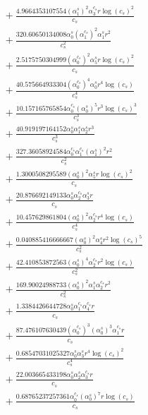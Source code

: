 \documentclass[10pt]{article}
\begin{document}
\begin{align*}
&{}  + \frac{4.9664353107554 \left(\alpha_{1}^s\right)^{2} \alpha_{3}^{c_s} r \log{\left(c_{s} \right)}^{2}}{c_{s}} \\
&{}  + \frac{320.60650134008 \alpha_{0}^s \left(\alpha_{1}^{c_s}\right)^{2} \alpha_{1}^s r^{2}}{c_{s}^{2}} \\
&{}  + \frac{2.5175750304999 \left(\alpha_{0}^{c_s}\right)^{2} \alpha_{5}^s r \log{\left(c_{s} \right)}^{2}}{c_{s}} \\
&{}  + \frac{40.575664933304 \left(\alpha_{0}^{c_s}\right)^{4} \alpha_{0}^s r^{4} \log{\left(c_{s} \right)}}{c_{s}^{4}} \\
&{}  + \frac{10.157165765854 \alpha_{0}^{c_s} \left(\alpha_{0}^s\right)^{5} r^{3} \log{\left(c_{s} \right)}^{3}}{c_{s}^{3}} \\
&{}  + \frac{40.919197164152 \alpha_{0}^s \alpha_{1}^s \alpha_{2}^s r^{3}}{c_{s}^{3}} \\
&{}  + \frac{327.36058924584 \alpha_{0}^{c_s} \alpha_{1}^{c_s} \left(\alpha_{1}^s\right)^{2} r^{2}}{c_{s}^{2}} \\
&{}  + \frac{1.3000508295589 \left(\alpha_{0}^s\right)^{2} \alpha_{5}^s r \log{\left(c_{s} \right)}^{2}}{c_{s}} \\
&{}  + \frac{20.876692149133 \alpha_{0}^s \alpha_{2}^{c_s} \alpha_{3}^s r}{c_{s}} \\
&{}  + \frac{10.457629861804 \left(\alpha_{0}^s\right)^{2} \alpha_{2}^{c_s} r^{4} \log{\left(c_{s} \right)}}{c_{s}^{4}} \\
&{}  + \frac{0.040885416666667 \left(\alpha_{0}^s\right)^{2} \alpha_{4}^s r^{2} \log{\left(c_{s} \right)}^{5}}{c_{s}^{2}} \\
&{}  + \frac{42.410853872563 \left(\alpha_{0}^s\right)^{4} \alpha_{2}^{c_s} r^{2} \log{\left(c_{s} \right)}}{c_{s}^{2}} \\
&{}  + \frac{169.90024988733 \left(\alpha_{0}^s\right)^{2} \alpha_{1}^s \alpha_{2}^{c_s} r^{2}}{c_{s}^{2}} \\
&{}  + \frac{1.3384426644728 \alpha_{0}^s \alpha_{1}^{c_s} \alpha_{4}^{c_s} r}{c_{s}} \\
&{}  + \frac{87.476107630439 \left(\alpha_{0}^{c_s}\right)^{3} \left(\alpha_{0}^s\right)^{3} \alpha_{1}^{c_s} r}{c_{s}} \\
&{}  + \frac{0.68547031025327 \alpha_{0}^s \alpha_{3}^s r^{4} \log{\left(c_{s} \right)}^{2}}{c_{s}^{4}} \\
&{}  + \frac{22.003665433198 \alpha_{0}^s \alpha_{2}^s \alpha_{3}^{c_s} r}{c_{s}} \\
&{}  + \frac{0.68765237257361 \alpha_{0}^{c_s} \left(\alpha_{0}^s\right)^{7} r \log{\left(c_{s} \right)}}{c_{s}} \\

\end{align*}
\end{document}
